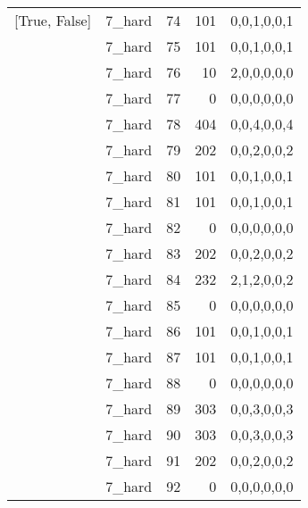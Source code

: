 \begin{tabular}{llrrl}
 [True, False]   & 7\_hard              &            74 &                   101 & 0,0,1,0,0,1   \\
 [True, False]   & 7\_hard              &            75 &                   101 & 0,0,1,0,0,1   \\
 [True, False]   & 7\_hard              &            76 &                    10 & 2,0,0,0,0,0   \\
 [True, False]   & 7\_hard              &            77 &                     0 & 0,0,0,0,0,0   \\
 [True, False]   & 7\_hard              &            78 &                   404 & 0,0,4,0,0,4   \\
 [True, False]   & 7\_hard              &            79 &                   202 & 0,0,2,0,0,2   \\
 [True, False]   & 7\_hard              &            80 &                   101 & 0,0,1,0,0,1   \\
 [True, False]   & 7\_hard              &            81 &                   101 & 0,0,1,0,0,1   \\
 [True, False]   & 7\_hard              &            82 &                     0 & 0,0,0,0,0,0   \\
 [True, False]   & 7\_hard              &            83 &                   202 & 0,0,2,0,0,2   \\
 [True, False]   & 7\_hard              &            84 &                   232 & 2,1,2,0,0,2   \\
 [True, False]   & 7\_hard              &            85 &                     0 & 0,0,0,0,0,0   \\
 [True, False]   & 7\_hard              &            86 &                   101 & 0,0,1,0,0,1   \\
 [True, False]   & 7\_hard              &            87 &                   101 & 0,0,1,0,0,1   \\
 [True, False]   & 7\_hard              &            88 &                     0 & 0,0,0,0,0,0   \\
 [True, False]   & 7\_hard              &            89 &                   303 & 0,0,3,0,0,3   \\
 [True, False]   & 7\_hard              &            90 &                   303 & 0,0,3,0,0,3   \\
 [True, False]   & 7\_hard              &            91 &                   202 & 0,0,2,0,0,2   \\
 [True, False]   & 7\_hard              &            92 &                     0 & 0,0,0,0,0,0   \\

\end{tabular}
